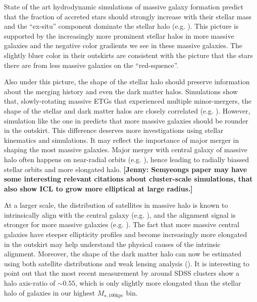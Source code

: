 \documentclass[a4paper,fleqn,usenatbib]{mnras}
\def\mtot{{$M_{\star,100\mathrm{kpc}}$}}
\newcommand{\jenny}[1]{\textcolor{Bittersweet}{\textbf{[Jenny: #1]}}}
\begin{document}
    State of the art hydrodynamic simulations of massive galaxy formation predict 
    that the fraction of accreted stars should strongly increase with their stellar 
    mass and the ``ex-situ'' component dominate the stellar halo (e.g.
    \citealt{Oser2010, Cooper2013, Dubois2013, LeeYi2013, Hirschmann2015,
    RodriguezGomez2016}). 
    This picture is supported by the increasingly more prominent stellar halos in 
    more massive galaxies and the negative color gradients we see in these massive 
    galaxies. 
    The slightly bluer color in their outskirts are consistent with the picture that 
    the stars there are from less massive galaxies on the ``red-squence''. 
    
    Also under this picture, the shape of the stellar halo should preserve information
    about the merging history and even the dark matter halos. 
    Simulations show that, slowly-rotating massive ETGs that experienced multiple 
    minor-mergers, the shape of the stellar and dark matter halos are closely 
    correlated (e.g. \citealt{Wu2014}). 
    However, simulation like the one in \citet{Wu2014} predicts that more massive 
    galaxies should be rounder in the outskirt.
    This difference deserves more investigations using stellar kinematics and 
    simulations. 
    It may reflect the importance of major merger in shaping the most massive 
    galaxies. 
    Major merger with central galaxy of massive halo often happens on near-radial 
    orbits (e.g. \citealt{Murante2007}), hence leading to radially biassed stellar 
    orbits and more elongated halo. \jenny{Semyeongs paper may have some interesting relevant 
    citations about cluster-scale simulations, that also show ICL to grow more elliptical at 
    large radius.}
    
    At a larger scale, the distribution of satellites in massive halo is known to 
    intrinsically align with the central galaxy (e.g. \citealt{Brainerd2005, 
    Yang2006b, NiedersteOstholt2010, HuangMandelbaum2016}), and the alignment signal
    is stronger for more massive galaxies (e.g. \citealt{Hirata2007}).
    The fact that more massive central galaxies have steeper ellipticity profiles 
    and become increasingly more elongated in the outskirt may help understand 
    the physical causes of the intrinsic alignment. 
    Moreover, the shape of the dark matter halo can now be estimated using both 
    satellite distributions and weak lensing analysis (\citealt{ClampittJain2016}). 
    It is interesting to point out that the most recent measurement by 
    \citet{Shin2017} around SDSS clusters show a halo axis-ratio of ${\sim}0.55$, 
    which is only slightly more elongated than the stellar halo of galaxies in our 
    highest \mtot{} bin.
    
\end{document}

